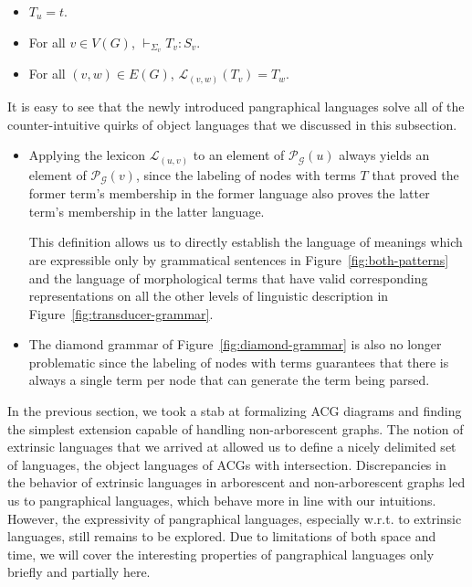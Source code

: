 \begin{itemize}
  \item $T_u = t$.
  \item For all $v \in V(G)$, $\vdash_{\Sigma_v} T_v : S_v$.
  \item For all $(v,w) \in E(G)$, $\mathcal{L}_{(v,w)}(T_v) = T_w$.
\end{itemize}

It is easy to see that the newly introduced pangraphical languages solve
all of the counter-intuitive quirks of object languages that we
discussed in this subsection.

\begin{itemize}
\item Applying the lexicon $\mathcal{L}_{(u,v)}$ to an element of
  $\mathcal{P}_{\mathcal{G}}(u)$ always yields an element of
  $\mathcal{P}_{\mathcal{G}}(v)$, since the labeling of nodes with terms
  $T$ that proved the former term's membership in the former language
  also proves the latter term's membership in the latter language.

  This definition allows us to directly establish the language of
  meanings which are expressible only by grammatical sentences in
  Figure~\ref{fig:both-patterns} and the language of morphological terms
  that have valid corresponding representations on all the other levels
  of linguistic description in Figure~\ref{fig:transducer-grammar}.
\item The diamond grammar of Figure~\ref{fig:diamond-grammar} is also no
  longer problematic since the labeling of nodes with terms guarantees
  that there is always a single term per node that can generate the term
  being parsed.
\end{itemize}

In the previous section, we took a stab at formalizing ACG diagrams and
finding the simplest extension capable of handling non-arborescent
graphs. The notion of extrinsic languages that we arrived at allowed us
to define a nicely delimited set of languages, the object languages of
ACGs with intersection. Discrepancies in the behavior of extrinsic
languages in arborescent and non-arborescent graphs led us to
pangraphical languages, which behave more in line with our
intuitions. However, the expressivity of pangraphical languages,
especially w.r.t. to extrinsic languages, still remains to be
explored. Due to limitations of both space and time, we will cover the
interesting properties of pangraphical languages only briefly and
partially here.

